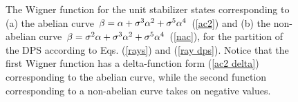 \documentclass[quantumrep,article,submit,pdftex,moreauthors]{Definitions/mdpi}
\providecommand{\DIFaddbeginFL}{} %
\providecommand{\DIFaddendFL}{} %
\providecommand{\DIFdelbeginFL}{} %
\providecommand{\DIFdelendFL}{} %
\begin{document}
\begin{figure}[ht]
  \centering
  \DIFdelbeginFL %
\DIFdelendFL \DIFaddbeginFL {}
  \DIFaddendFL \quad 
  \DIFdelbeginFL %
\DIFdelendFL \DIFaddbeginFL {}
  \DIFaddendFL \caption{
    The Wigner function for the unit stabilizer states corresponding to (a) the
    abelian curve $\protect\beta = \protect\alpha + \protect\sigma^3
    \protect\alpha^2 + \protect\sigma^5 \protect\alpha^4$ (\DIFaddbeginFL \protect\DIFaddendFL \ref{ac2})
    and (b) the non-abelian curve $\protect\beta = \protect\sigma^2 \protect
    \alpha + \protect\sigma^3 \protect\alpha^2 +
    \protect\sigma^{5}\protect\alpha^{4}$ (\DIFaddbeginFL \protect\DIFaddendFL \ref{nac}), for the partition
    of the DPS according to Eqs. (\DIFaddbeginFL \protect\DIFaddendFL \ref{rays}) and (\DIFaddbeginFL \protect\DIFaddendFL \ref{ray
    dps}). Notice that the first Wigner function has a delta-function form
    (\DIFaddbeginFL \protect\DIFaddendFL \ref{ac2 delta}) corresponding to the abelian curve, while the
    second function corresponding to a non-abelian curve takes on negative
    values.
  }
  \DIFdelbeginFL %
\DIFdelendFL \DIFaddbeginFL \label{fig2}
\DIFaddendFL \end{figure}
\end{document}
